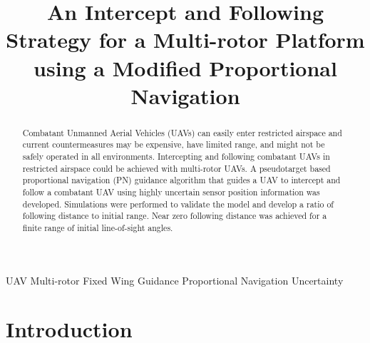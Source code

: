 \documentclass[conference]{IEEEtran}
\begin{document}
\title{An Intercept and Following Strategy for a Multi-rotor Platform using a Modified Proportional Navigation}

\author{
\and
{}
}

\maketitle


\begin{abstract}
	Combatant Unmanned Aerial Vehicles (UAVs) can easily enter restricted airspace and current countermeasures may be expensive, have limited range, and might not be safely operated in all environments. Intercepting and following combatant UAVs in restricted airspace could be achieved with multi-rotor UAVs. A pseudotarget based proportional navigation (PN) guidance algorithm that guides a UAV to intercept and follow a combatant UAV using highly uncertain sensor position information was developed. Simulations were performed to validate the model and develop a ratio of following distance to initial range. Near zero following distance was achieved for a finite range of initial line-of-sight angles.
\end{abstract}

\begin{IEEEkeywords}
	UAV
	Multi-rotor
	Fixed Wing
	Guidance
	Proportional Navigation
	Uncertainty

\end{IEEEkeywords}

\section{Introduction}
\end{document}
